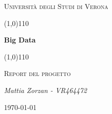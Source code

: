 \documentclass{article}
\begin{document}
    \clearpage

    \begin{titlepage}
        \centering
        \vspace*{\fill}
        {\scshape\LARGE Università degli Studi di Verona \par}
        \vspace{1.5cm}
        \line(1,0){110} \\
        {\huge\bfseries Big Data \par}
        \line(1,0){110} \\
        \vspace{0.5cm}
        {\scshape\LARGE Report del progetto \par}
        \vspace{2cm}
        {\Large\itshape Mattia Zorzan - VR464472 \par}
        \vspace{1cm}

        \vspace{5cm}
        \vspace*{\fill}
        {\large \today \par}
    \end{titlepage}
    \thispagestyle{empty}
    \newpage
    \tableofcontents
    \thispagestyle{empty}
    \newpage
\end{document}
